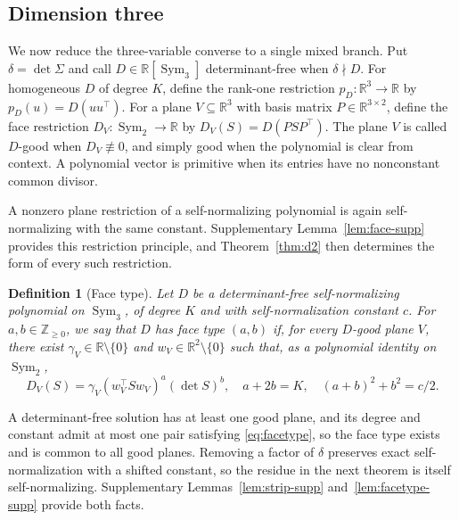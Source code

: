 \documentclass[12pt,a4paper]{article}
\theoremstyle{plain}
\newtheorem{definition}{Definition}
\theoremstyle{definition}
\newcommand{\R}{\mathbb{R}}
\newcommand{\Sym}{\operatorname{Sym}}
\begin{document}
\subsection{Dimension three}

We now reduce the three-variable converse to a single mixed branch.
Put $\delta=\det\Sigma$ and call $D\in\R[\Sym_3]$ determinant-free when $\delta\nmid D$.
For homogeneous $D$ of degree $K$, define the rank-one restriction $p_D:\R^3\to\R$ by $p_D(u)=D(uu^\top)$.
For a plane $V\subseteq\R^3$ with basis matrix $P\in\R^{3\times2}$, define the face restriction $D_V:\Sym_2\to\R$ by $D_V(S)=D(PSP^\top)$.
The plane $V$ is called $D$-good when $D_V\not\equiv0$, and simply good when the polynomial is clear from context.
A polynomial vector is primitive when its entries have no nonconstant common divisor.

A nonzero plane restriction of a self-normalizing polynomial is again self-normalizing with the same constant.
Supplementary Lemma~\ref{lem:face-supp} provides this restriction principle, and Theorem~\ref{thm:d2} then determines the form of every such restriction.
\begin{definition}[Face type]
\label{def:face-type}
    Let $D$ be a determinant-free self-normalizing polynomial on $\Sym_3$, of degree $K$ and with self-normalization constant $c$.
    For $a,b\in\mathbb{Z}_{\ge0}$, we say that $D$ has face type $(a,b)$ if, for every $D$-good plane $V$, there exist $\gamma_V\in\R\setminus\{0\}$ and $w_V\in\R^2\setminus\{0\}$ such that, as a polynomial identity on $\Sym_2$,
    \begin{equation}
    \label{eq:facetype}
        D_V(S)
        =
        \gamma_V(w_V^\top S w_V)^a(\det S)^b
        ,
        \quad
        a+2b
        =
        K
        ,
        \quad
        (a+b)^2+b^2
        =
        c/2
        .
    \end{equation}
\end{definition}
A determinant-free solution has at least one good plane, and its degree and constant admit at most one pair satisfying \eqref{eq:facetype}, so the face type exists and is common to all good planes.
Removing a factor of $\delta$ preserves exact self-normalization with a shifted constant, so the residue in the next theorem is itself self-normalizing.
Supplementary Lemmas~\ref{lem:strip-supp} and~\ref{lem:facetype-supp} provide both facts.
\end{document}
